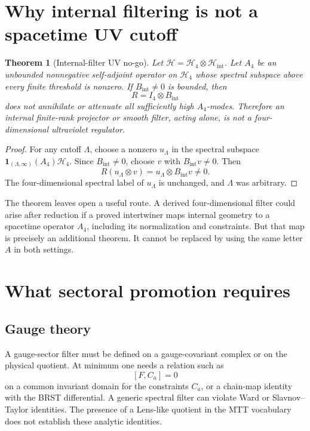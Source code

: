 \documentclass[11pt]{article}
\newtheorem{theorem}{Theorem}[section]
\theoremstyle{definition}
\theoremstyle{remark}
\newcommand{\Hspace}{\mathcal H}
\newcommand{\Id}{I}
\begin{document}
\section{Why internal filtering is not a spacetime UV cutoff}

\begin{theorem}[Internal-filter UV no-go]
\label{thm:no-go}
Let \(\Hspace=\Hspace_4\otimes\Hspace_{\mathrm{int}}\). Let \(A_4\) be an
unbounded nonnegative self-adjoint operator on \(\Hspace_4\) whose spectral
subspace above every finite threshold is nonzero. If
\(B_{\mathrm{int}}\neq0\) is bounded, then
\[
 R=\Id_4\otimes B_{\mathrm{int}}
\]
does not annihilate or attenuate all sufficiently high \(A_4\)-modes.
Therefore an internal finite-rank projector or smooth filter, acting alone,
is not a four-dimensional ultraviolet regulator.
\end{theorem}

\begin{proof}
For any cutoff \(\Lambda\), choose a nonzero
\(u_\Lambda\) in the spectral subspace
\(\mathbf 1_{(\Lambda,\infty)}(A_4)\Hspace_4\). Since
\(B_{\mathrm{int}}\neq0\), choose \(v\) with
\(B_{\mathrm{int}}v\neq0\). Then
\[
 R(u_\Lambda\otimes v)
 =u_\Lambda\otimes B_{\mathrm{int}}v\neq0.
\]
The four-dimensional spectral label of \(u_\Lambda\) is unchanged, and
\(\Lambda\) was arbitrary.
\end{proof}

The theorem leaves open a useful route. A derived four-dimensional filter
could arise after reduction if a proved intertwiner maps internal geometry
to a spacetime operator \(A_4\), including its normalization and constraints.
But that map is precisely an additional theorem. It cannot be replaced by
using the same letter \(A\) in both settings.

\section{What sectoral promotion requires}

\subsection{Gauge theory}

A gauge-sector filter must be defined on a gauge-covariant complex or on the
physical quotient. At minimum one needs a relation such as
\[
 [F,C_a]=0
\]
on a common invariant domain for the constraints \(C_a\), or a chain-map
identity with the BRST differential. A generic spectral filter can violate
Ward or Slavnov--Taylor identities. The presence of a Lens-like quotient in
the MTT vocabulary does not establish these analytic identities.
\end{document}

